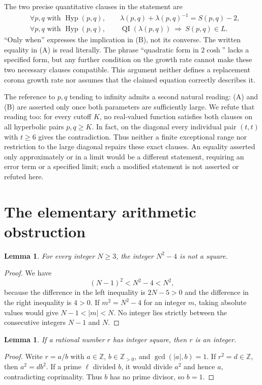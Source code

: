 \documentclass[11pt]{article}
\newtheorem{lemma}[theorem]{Lemma}
\newcommand{\QI}{\operatorname{QI}}
\newcommand{\HH}{\operatorname{Hyp}}
\begin{document}
The two precise quantitative clauses in the statement are
\begin{align}
\tag{A}\label{A}
&\forall p,q\text{ with }\HH(p,q),\qquad
\lambda(p,q)+\lambda(p,q)^{-1}=S(p,q)-2,\\
\tag{B}\label{B}
&\forall p,q\text{ with }\HH(p,q),\qquad
\QI(\lambda(p,q))\ \Longrightarrow\ S(p,q)\in L.
\end{align}
``Only when'' expresses the implication in (B), not its converse.
The written equality in (A) is read literally. The phrase ``quadratic form
in $2\cosh$'' lacks a specified form, but any further condition on the growth
rate cannot make these two necessary clauses compatible. This argument
neither defines a replacement corona growth rate nor assumes that the
claimed equation correctly describes it.

The reference to $p,q$ tending to infinity admits a second natural reading:
(A) and (B) are asserted only once both parameters are sufficiently large.
We refute that reading too: for every cutoff $K$, no real-valued function
satisfies both clauses on all hyperbolic pairs $p,q\ge K$. In fact, on the
diagonal every individual pair $(t,t)$ with $t\ge6$ gives the contradiction.
Thus neither a finite exceptional range nor restriction to the large diagonal
repairs these exact clauses. An equality asserted only approximately or in a
limit would be a different statement, requiring an error term or a specified
limit; such a modified statement is not asserted or refuted here.

\section{The elementary arithmetic obstruction}
\begin{lemma}\label{nonsquare}
For every integer $N\ge3$, the integer $N^2-4$ is not a square.
\end{lemma}
\begin{proof}
We have
\[
(N-1)^2<N^2-4<N^2,
\]
because the difference in the left inequality is $2N-5>0$ and the difference
in the right inequality is $4>0$. If $m^2=N^2-4$ for an integer $m$, taking
absolute values would give $N-1<|m|<N$. No integer lies strictly between the
consecutive integers $N-1$ and $N$.
\end{proof}

\begin{lemma}\label{rational-square}
If a rational number $r$ has integer square, then $r$ is an integer.
\end{lemma}
\begin{proof}
Write $r=a/b$ with $a\in\mathbb Z$, $b\in\mathbb Z_{>0}$, and
$\gcd(|a|,b)=1$. If $r^2=d\in\mathbb Z$, then $a^2=db^2$. If a prime
$\ell$ divided $b$, it would divide $a^2$ and hence $a$, contradicting
coprimality. Thus $b$ has no prime divisor, so $b=1$.
\end{proof}
\end{document}
